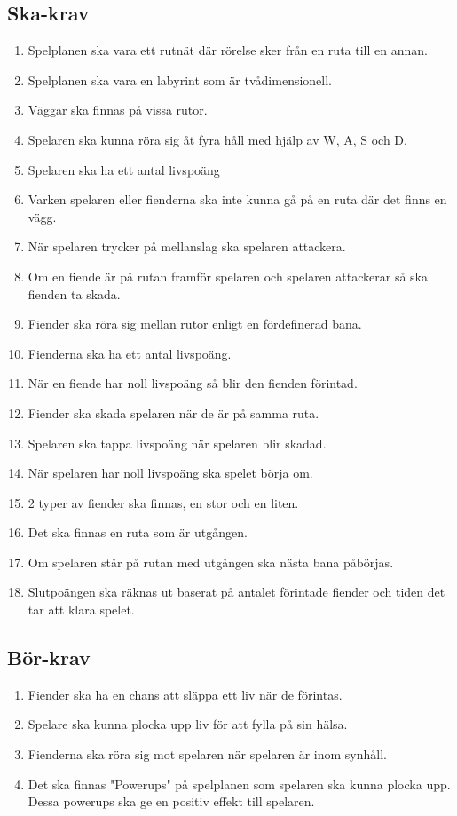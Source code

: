 \documentclass{TDP005mall}
\begin{document}
\subsection{Ska-krav}
\begin{enumerate}
  \item Spelplanen ska vara ett rutnät där rörelse sker från en ruta till en annan.
  \item Spelplanen ska vara en labyrint som är tvådimensionell.
  \item Väggar ska finnas på vissa rutor.
  \item Spelaren ska kunna röra sig åt fyra håll med hjälp av W, A, S och D.
  \item Spelaren ska ha ett antal livspoäng
  \item Varken spelaren eller fienderna ska inte kunna gå på en ruta där det finns en vägg.
  \item När spelaren trycker på mellanslag ska spelaren attackera.
  \item Om en fiende är på rutan framför spelaren och spelaren attackerar så ska fienden ta skada.
  \item Fiender ska röra sig mellan rutor enligt en fördefinerad bana.
  \item Fienderna ska ha ett antal livspoäng.
  \item När en fiende har noll livspoäng så blir den fienden förintad.
  \item Fiender ska skada spelaren när de är på samma ruta.
  \item Spelaren ska tappa livspoäng när spelaren blir skadad.
  \item När spelaren har noll livspoäng ska spelet börja om.
  \item 2 typer av fiender ska finnas, en stor och en liten.
  \item Det ska finnas en ruta som är utgången.
  \item Om spelaren står på rutan med utgången ska nästa bana påbörjas.
  \item Slutpoängen ska räknas ut baserat på antalet förintade fiender och tiden det tar att klara spelet.
\end{enumerate}

\subsection{Bör-krav}
\begin{enumerate}
  \item Fiender ska ha en chans att släppa ett liv när de förintas.
  \item Spelare ska kunna plocka upp liv för att fylla på sin hälsa.
  \item Fienderna ska röra sig mot spelaren när spelaren är inom synhåll.
  \item Det ska finnas "Powerups" på spelplanen som spelaren ska kunna plocka upp. Dessa powerups ska ge en positiv effekt till spelaren.
\end{enumerate}
\end{document}

